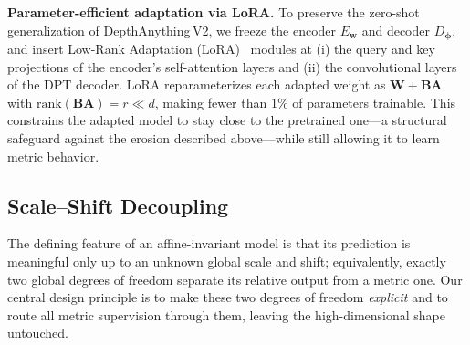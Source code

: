 \textbf{Parameter-efficient adaptation via LoRA.} To preserve the zero-shot generalization of DepthAnything\,V2, we freeze the encoder \(E_{\mathbf w}\) and decoder \(D_{\boldsymbol\phi}\), and insert Low-Rank Adaptation (LoRA)~\cite{hu2022lora} modules at (i) the query and key projections of the encoder's self-attention layers and (ii) the convolutional layers of the DPT decoder. LoRA reparameterizes each adapted weight as \(\mathbf{W} + \mathbf{B}\mathbf{A}\) with \(\mathrm{rank}(\mathbf{B}\mathbf{A}) = r \ll d\), making fewer than \(1\%\) of parameters trainable. This constrains the adapted model to stay close to the pretrained one---a structural safeguard against the erosion described above---while still allowing it to learn metric behavior.

\subsection{Scale--Shift Decoupling}

The defining feature of an affine-invariant model is that its prediction is meaningful only up to an unknown global scale and shift; equivalently, exactly two global degrees of freedom separate its relative output from a metric one. Our central design principle is to make these two degrees of freedom \emph{explicit} and to route all metric supervision through them, leaving the high-dimensional shape untouched.

